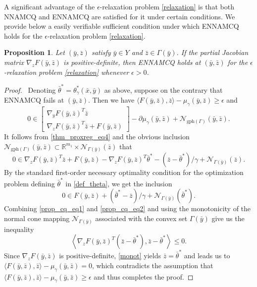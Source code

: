 \documentclass[11pt,a4paper]{article}
\newtheorem{proposition}[theorem]{Proposition}
\theoremstyle{plain}
\begin{document}
A significant advantage of the $\epsilon$-relaxation problem \eqref{relaxation} is that both NNAMCQ and ENNAMCQ are satisfied for it under certain conditions. We provide below a easily verifiable sufficient condition under which ENNAMCQ holds for the $\epsilon$-relaxation problem \eqref{relaxation}.

\begin{proposition} Let \( (\bar{y}, \bar{z}) \) satisfy $\bar{y} \in Y$ and $\bar{z} \in \Gamma(\bar{y})$. If the partial Jacobian matrix $\nabla_z F(\bar{y}, \bar{z})$ is positive-definite, then ENNAMCQ holds at \( (\bar{y}, \bar{z}) \) for the $\epsilon$-relaxation problem \eqref{relaxation} whenever $\epsilon >0$.
\end{proposition}
\begin{proof}\,
Denoting $\bar{\theta}^* =  \theta_\gamma^*(\bar{x}, \bar{y}) $ as above, suppose on the contrary that ENNAMCQ fails at $(\bar{y}, \bar{z})$. Then we have $ \langle F(\bar{y}, \bar{z}), \bar{z}\rangle - \mu_\gamma(\bar{y}, \bar{z}) \ge \epsilon$ and 
\[
0 \in \begin{bmatrix}
\nabla_y F(\bar{y}, \bar{z})^T\bar{z} \\ \nabla_z F(\bar{y}, \bar{z})^T\bar{z} + F(\bar{y}, \bar{z})
\end{bmatrix}
 - \partial \mu_\gamma(\bar{y}, \bar{z}) + \mathcal{N}_{\mathrm{gph}(\Gamma)}(\bar{y}, \bar{z}).
\]
It follows from \eqref{thm_proxreg_eq4} and the obvious inclusion $\mathcal{N}_{\mathrm{gph}(\Gamma)}(\bar{y}, \bar{z}) \subset \mathbb{R}^{m_1} \times \mathcal{N}_{\Gamma(\bar{y})}(\bar{z})$ that
\begin{equation}\label{prop_cq_eq1}
0 \in  \nabla_z F(\bar{y}, \bar{z})^T\bar{z} + F(\bar{y}, \bar{z}) -  \nabla_z F(\bar{y}, \bar{z})^T\bar{\theta}^* - (\bar{z} - \bar{\theta}^* )/\gamma + \mathcal{N}_{\Gamma(\bar{y})}(\bar{z}).
\end{equation}
By the standard first-order necessary optimality condition for the optimization problem defining $\bar{\theta}^*$ in \eqref{def_theta}, we get the inclusion
\begin{equation}\label{prop_cq_eq2}
0 \in F(\bar{y}, \bar{z}) + (\bar{\theta}^* - \bar{z})/\gamma + \mathcal{N}_{\Gamma(\bar{y})}( \bar{\theta}^*  ).
\end{equation}
Combining \eqref{prop_cq_eq1} and \eqref{prop_cq_eq2} and using the monotonicity of the normal cone mapping $\mathcal{N}_{\Gamma(\bar{y})}$ associated with the convex set $\Gamma(\bar y)$ give us the inequality
\begin{equation}\label{monot}
\left\langle \nabla_z F(\bar{y}, \bar{z})^T \left(\bar{z} - \bar{\theta}^*\right), \bar{z} -   \bar{\theta}^* \right\rangle \le 0.
\end{equation}
Since \( \nabla_z F(\bar{y}, \bar{z}) \) is positive-definite, \eqref{monot} yields $\bar{z} = \bar{\theta}^*$ and leads us to $\langle F(\bar{y}, \bar{z}), \bar{z}\rangle - \mu_\gamma(\bar{y}, \bar{z}) = 0$, which contradicts the assumption that $\langle F(\bar{y}, \bar{z}), \bar{z}\rangle - \mu_\gamma(\bar{y}, \bar{z}) \ge \epsilon$ and thus completes the proof.
\end{proof}
\end{document}
